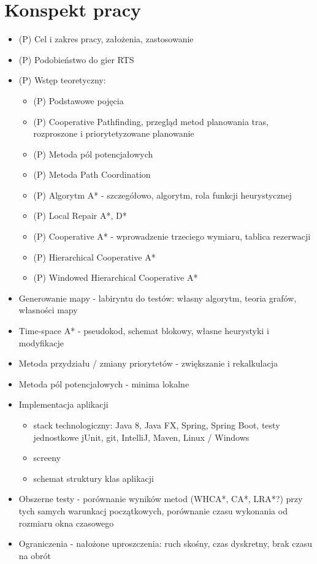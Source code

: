 \chapter{Konspekt pracy}
\label{ch:konspekt}
\begin{itemize}
	\item (P) Cel i zakres pracy, założenia, zastosowanie
	\item (P) Podobieństwo do gier RTS
	\item (P) Wstęp teoretyczny:
	\begin{itemize}
		\item (P) Podstawowe pojęcia
		\item (P) Cooperative Pathfinding, przegląd metod planowania tras, rozproszone i priorytetyzowane planowanie
		\item (P) Metoda pól potencjałowych
		\item (P) Metoda Path Coordination
		\item (P) Algorytm A* - szczegółowo, algorytm, rola funkcji heurystycznej
		\item (P) Local Repair A*, D*
		\item (P) Cooperative A* - wprowadzenie trzeciego wymiaru, tablica rezerwacji
		\item (P) Hierarchical Cooperative A*
		\item (P) Windowed Hierarchical Cooperative A*
	\end{itemize}
	\item Generowanie mapy - labiryntu do testów: własny algorytm, teoria grafów, własności mapy
	\item Time-space A* - pseudokod, schemat blokowy, własne heurystyki i modyfikacje
	\item Metoda przydziału / zmiany priorytetów - zwiększanie i rekalkulacja
	\item Metoda pól potencjałowych - minima lokalne
	\item Implementacja aplikacji
	\begin{itemize}
		\item stack technologiczny: Java 8, Java FX, Spring, Spring Boot, testy jednostkowe jUnit, git, IntelliJ, Maven, Linux / Windows
		\item screeny
		\item schemat struktury klas aplikacji
	\end{itemize}
	\item Obszerne testy - porównanie wyników metod (WHCA*, CA*, LRA*?) przy tych samych warunkacj początkowych, porównanie czasu wykonania od rozmiaru okna czasowego
	\item Ograniczenia - nałożone uproszczenia: ruch skośny, czas dyskretny, brak czasu na obrót
\end{itemize}